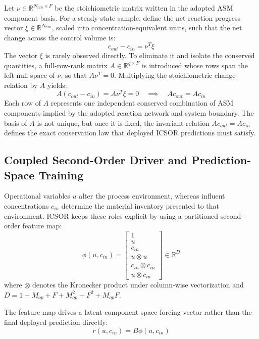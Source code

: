 \documentclass[11pt]{article}
\begin{document}
Let $\nu \in \mathbb{R}^{N_{rxn} \times F}$ be the stoichiometric matrix written in the adopted ASM component basis. For a steady-state sample, define the net reaction progress vector $\xi \in \mathbb{R}^{N_{rxn}}$, scaled into concentration-equivalent units, such that the net change across the control volume is:
\begin{equation}
c_{out} - c_{in} = \nu^T \xi
\end{equation}
The vector $\xi$ is rarely observed directly. To eliminate it and isolate the conserved quantities, a full-row-rank matrix $A \in \mathbb{R}^{q \times F}$ is introduced whose rows span the left null space of $\nu$, so that $A\nu^T = 0$. Multiplying the stoichiometric change relation by $A$ yields:
\begin{equation}
A(c_{out} - c_{in}) = A \nu^T \xi = 0 \quad \implies \quad A c_{out} = A c_{in}
\end{equation}
Each row of $A$ represents one independent conserved combination of ASM components implied by the adopted reaction network and system boundary. The basis of $A$ is not unique, but once it is fixed, the invariant relation $Ac_{out} = Ac_{in}$ defines the exact conservation law that deployed ICSOR predictions must satisfy.

\subsection{Coupled Second-Order Driver and Prediction-Space Training}

Operational variables $u$ alter the process environment, whereas influent concentrations $c_{in}$ determine the material inventory presented to that environment. ICSOR keeps these roles explicit by using a partitioned second-order feature map:
\begin{equation}
\phi(u, c_{in}) = \begin{bmatrix}
1 \\
u \\
c_{in} \\
u \otimes u \\
c_{in} \otimes c_{in} \\
u \otimes c_{in}
\end{bmatrix} \in \mathbb{R}^{D}
\end{equation}
where $\otimes$ denotes the Kronecker product under column-wise vectorization and $D = 1 + M_{op} + F + M_{op}^2 + F^2 + M_{op}F$.

The feature map drives a latent component-space forcing vector rather than the final deployed prediction directly:
\begin{equation}
r(u, c_{in}) = B \phi(u, c_{in})
\end{equation}
\end{document}
